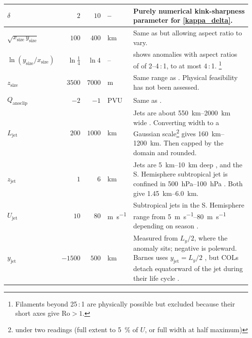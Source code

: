 \documentclass{article}
\begin{document}
\begin{xltabular}{\textwidth}{@{}
    >{\raggedright\arraybackslash}l
    r
    r
    >{\raggedright\arraybackslash}l
    >{\raggedright\arraybackslash}X
  @{}}
     \\
  \rowsep
  $\delta$ & $2$ & $10$ & -- &
    Purely numerical kink-sharpness parameter for \cref{kappa_delta}. \\
  \midrule
  $\sqrt{x_\text{size}\, y_\text{size}}$ & $100$ & $400$ & \unit{\kilo\meter} &
    Same as \cite{Barnes2022main} but allowing aspect ratio to vary.\\
  \rowsep
  $\ln(y_\text{size}/x_\text{size})$ & $\ln\tfrac14$ & $\ln 4$ & -- &
    \cite{fehlmann1997pvelements} shows anomalies with aspect ratios of of 2--4\,:\,1, to at most 4\,:\,1.
    \footnote{Filaments beyond 25\,:\,1 are physically possible \cite{fehlmann1997pvelements} but excluded because their short axes give $\mathrm{Ro} > 1$.}
     \\
  \rowsep
  $z_\text{size}$ & $3500$ & $7000$ & \unit{\meter} &
    Same range as \cite{Barnes2022main}.
    Physical feasibility has not been assessed. \\
  \rowsep
  $Q_\text{anoclip}$ & $-2$ & $-1$ & \unit{PVU} &
    Same as \cite{Barnes2022main}. \\
  \midrule
  $L_\text{jet}$ & $200$ & $1000$ & \unit{\kilo\meter} &
    Jets are about \qtyrange{550}{2000}{\kilo\meter} wide \cite{Stull2015}.
    Converting width to a Gaussian scale\footnote{under two readings (full extent to \qty{5}{\percent} of $U$, or full width at half maximum)} gives \qtyrange{160}{1200}{\kilo\meter}. Then capped by the domain and rounded. \\
  \rowsep
  $z_\text{jet}$ & $1$ & $6$ & \unit{\kilo\meter} &
    Jets are \qtyrange{5}{10}{\kilo\meter} deep \cite{Stull2015}, and the S. Hemisphere subtropical jet is confined in \qtyrange{500}{100}{\hecto\pascal} \cite{BalsElsholz2001}.
    Both give \qtyrange{1.45}{6.0}{\kilo\meter}.
    \\
  \rowsep
  $U_\text{jet}$ & $10$ & $80$ & \unit{\meter\per\second} &
    Subtropical jets in the S. Hemisphere range from \qtyrange{5}{80}{\meter\per\second} depending on season \cite{Stull2015}. \\
  \rowsep
  $y_\text{jet}$ & $-1500$ & $500$ & \unit{\kilo\meter} &
    Measured from $L_y/2$, where the anomaly sits; negative is poleward.
    Barnes uses $y_\text{jet} = L_y /2$ \cite{Barnes2022main}, but COLs detach equatorward of the jet during their life cycle \cite{Barnes2021col}.

\end{xltabular}
\end{document}
